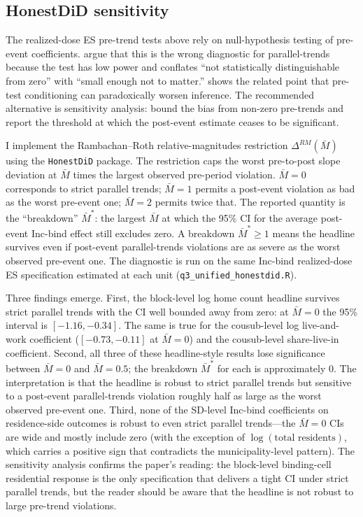\documentclass[12pt]{article}
\begin{document}
\subsection{HonestDiD sensitivity}
\label{app:rob-honestdid}
\label{app:es-honestdid}

The realized-dose ES pre-trend tests above rely on null-hypothesis
testing of pre-event coefficients. \citet{rambachanMoreCredibleApproach2023}
argue that this is the wrong diagnostic for parallel-trends because
the test has low power and conflates ``not statistically distinguishable
from zero'' with ``small enough not to matter.''
\citet{rothPretestProblemsCausal2022} shows the related point that
pre-test conditioning can paradoxically worsen inference. The
recommended alternative is sensitivity analysis: bound the bias from
non-zero pre-trends and report the threshold at which the post-event
estimate ceases to be significant.

I implement the Rambachan--Roth relative-magnitudes restriction
$\Delta^{RM}(\bar{M})$ using the \texttt{HonestDiD} package. The
restriction caps the worst pre-to-post slope deviation at $\bar{M}$
times the largest observed pre-period violation. $\bar{M} = 0$
corresponds to strict parallel trends; $\bar{M} = 1$ permits a
post-event violation as bad as the worst pre-event one; $\bar{M} = 2$
permits twice that. The reported quantity is the ``breakdown''
$\bar{M}^{*}$: the largest $\bar{M}$ at which the 95\% CI for the
average post-event Inc-bind effect still excludes zero. A breakdown
$\bar{M}^{*} \geq 1$ means the headline survives even if post-event
parallel-trends violations are as severe as the worst observed
pre-event one. The diagnostic is run on the same Inc-bind
realized-dose ES specification estimated at each unit
(\texttt{q3\_unified\_honestdid.R}).



Three findings emerge. First, the block-level log home count
headline survives strict parallel trends with the CI well bounded
away from zero: at $\bar{M} = 0$ the 95\% interval is $[-1.16, -0.34]$.
The same is true for the cousub-level log live-and-work coefficient
($[-0.73, -0.11]$ at $\bar{M}=0$) and the cousub-level share-live-in
coefficient. Second, all three of these headline-style results lose
significance between $\bar{M} = 0$ and $\bar{M} = 0.5$; the
breakdown $\bar{M}^{*}$ for each is approximately $0$. The
interpretation is that the headline is robust to strict parallel
trends but sensitive to a post-event parallel-trends violation
roughly half as large as the worst observed pre-event one. Third,
none of the SD-level Inc-bind coefficients on residence-side
outcomes is robust to even strict parallel trends---the
$\bar{M} = 0$ CIs are wide and mostly include zero (with the
exception of $\log(\text{total residents})$, which carries a
positive sign that contradicts the municipality-level pattern). The
sensitivity analysis confirms the paper's reading: the block-level
binding-cell residential response is the only specification that
delivers a tight CI under strict parallel trends, but the reader
should be aware that the headline is not robust to large pre-trend
violations.
\end{document}
